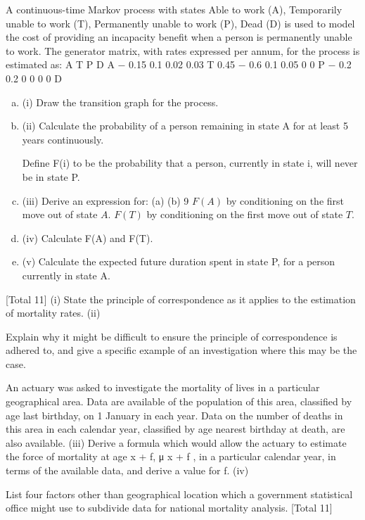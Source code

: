 \documentclass[a4paper,12pt]{article}
\begin{document}
\begin{enumerate}
A continuous-time Markov process with states {Able to work (A), Temporarily unable to work (T), Permanently unable to work (P), Dead (D)} is used to model the cost of providing an incapacity benefit when a person is permanently unable to work. The generator matrix, with rates expressed per annum, for the process is estimated as:
A
T
P
D
A − 0.15 0.1 0.02 0.03
T 0.45 − 0.6 0.1 0.05
0
0
P
− 0.2 0.2
0
0
0
0
D
\begin{enumerate}[(a)]
\item (i) Draw the transition graph for the process.
\item (ii) Calculate the probability of a person remaining in state A for at least 5 years continuously.

Define F(i) to be the probability that a person, currently in state i, will never be in state P.

\item (iii)
Derive an expression for:
(a)
(b)
9
$F(A)$ by conditioning on the first move out of state $A$.
$F(T)$ by conditioning on the first move out of state $T$.

\item 
(iv) Calculate F(A) and F(T).
\item 
(v) Calculate the expected future duration spent in state P, for a person currently
in state A.
\end{enumerate}

[Total 11]
(i) State the principle of correspondence as it applies to the estimation of
mortality rates.
(ii)


Explain why it might be difficult to ensure the principle of correspondence is
adhered to, and give a specific example of an investigation where this may be
the case.

An actuary was asked to investigate the mortality of lives in a particular geographical area. Data are available of the population of this area, classified by age last birthday, on 1 January in each year. Data on the number of deaths in this area in each calendar
year, classified by age nearest birthday at death, are also available.
(iii)
Derive a formula which would allow the actuary to estimate the force of mortality at age x + f, μ x + f , in a particular calendar year, in terms of the available data, and derive a value for f.
(iv)

List four factors other than geographical location which a government statistical office might use to subdivide data for national mortality analysis. 
[Total 11]


\end{enumerate}
\end{document}
